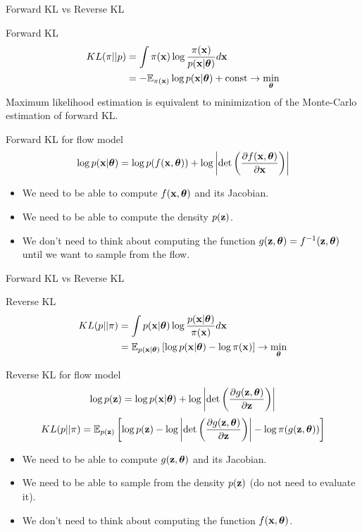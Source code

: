 \begin{frame}{Forward KL vs Reverse KL}
	\begin{block}{Forward KL}
		\vspace{-0.5cm}
		\begin{align*}
			KL(\pi || p) &= \int \pi (\mathbf{x}) \log \frac{\pi(\mathbf{x})}{p(\mathbf{x} | \boldsymbol{\theta})} d \mathbf{x} \\
			&= - \mathbb{E}_{\pi(\mathbf{x})} \log p(\mathbf{x} | \boldsymbol{\theta}) + \text{const} \rightarrow \min_{\boldsymbol{\theta}}
		\end{align*}
		Maximum likelihood estimation is equivalent to minimization of the Monte-Carlo estimation of forward KL.
	\end{block}
	\begin{block}{Forward KL for flow model}
	    \vspace{-0.3cm}
		\[
			\log p(\mathbf{x}|\boldsymbol{\theta}) = \log p(f(\mathbf{x}, \boldsymbol{\theta})) + \log  \left|\det \left( \frac{\partial f(\mathbf{x}, \boldsymbol{\theta})}{\partial \mathbf{x}} \right) \right|
		\]
		\begin{itemize}
		\item We need to be able to compute $f(\mathbf{x}, \boldsymbol{\theta})$ and its Jacobian.
		\item We need to be able to compute the density $p(\mathbf{z})$.
		\item We don’t need to think about computing the function $g(\mathbf{z}, \boldsymbol{\theta}) = f^{-1}(\mathbf{z}, \boldsymbol{\theta})$ until we want to sample from the flow.
		\end{itemize}
	\end{block}
\end{frame}
\begin{frame}{Forward KL vs Reverse KL}
	\begin{block}{Reverse KL}
	  	\vspace{-0.5cm}
			\begin{align*}
				KL(p || \pi) &= \int p(\mathbf{x} | \boldsymbol{\theta}) \log \frac{p(\mathbf{x} | \boldsymbol{\theta})}{\pi(\mathbf{x})} d \mathbf{x} \\
				&= \mathbb{E}_{p(\mathbf{x} | \boldsymbol{\theta})} \left[\log p(\mathbf{x} | \boldsymbol{\theta}) - \log \pi(\mathbf{x})\right] \rightarrow \min_{\boldsymbol{\theta}}
			\end{align*}
		\vspace{-0.7cm}
	\end{block}
	\begin{block}{Reverse KL for flow model}
  		\vspace{-0.3cm}
		\[
			\log p(\mathbf{z}) = \log p(\mathbf{x} | \boldsymbol{\theta}) + \log \left|\det \left( \frac{\partial g(\mathbf{z}, \boldsymbol{\theta})}{\partial \mathbf{z}} \right) \right|
		\]
		\[
			KL(p || \pi)  = \mathbb{E}_{p(\mathbf{z})} \left[  \log p(\mathbf{z}) - \log \left|\det \left( \frac{\partial g(\mathbf{z}, \boldsymbol{\theta})}{\partial \mathbf{z}} \right) \right| - \log \pi(g(\mathbf{z}, \boldsymbol{\theta})) \right]
		\]
		\begin{itemize}
		\item We need to be able to compute $g(\mathbf{z}, \boldsymbol{\theta})$ and its Jacobian.
		\item We need to be able to sample from the density $p(\mathbf{z})$ (do not need to evaluate it).
		\item We don’t need to think about computing the function $f(\mathbf{x}, \boldsymbol{\theta})$.
		\end{itemize}
	\end{block}
\end{frame}
